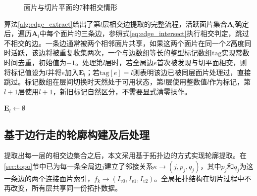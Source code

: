 \begin{figure}[htbp]
\centering
\caption{面片与切片平面的7种相交情形}
\label{fig:intersect_cases}
\end{figure}

算法\ref{alg:edge_extract}给出了第$l$层相交边提取的完整流程，活跃面片集合$\bm{A}_{l}$确定后，遍历$\bm{A}_{l}$中每个面片的三条边，参照式\eqref{eq:edge_intersect}执行相交判定，跳过不相交的边。一条边通常被两个相邻面片共享，如果这两个面片在同一个$Z$高度同时活跃，该边将被重复收集两次，一个与边数组等长的整型标记数组$\bm{\mathrm{tag}}$实现常数时间去重，初始值为$-1$。处理第$l$层时，若全局边$e$首次被发现与切平面相交，则将标记值设为$l$并将$e$加入$\bm{E}_{l}$；若$\bm{\mathrm{tag}}[e]=l$则表明该边已被同层面片处理过，直接跳过。标记数组在层间切换时天然处于可用状态，第$l$层使用整数值$l$作为标记，第$l+1$层使用$l+1$，新旧标记自然区分，不需要显式清零操作。

\begin{algorithm}[htbp]
\caption{相交边提取以及层内去重}
\label{alg:edge_extract}

$\bm{E}_{l}\leftarrow\emptyset$\;
\;
\end{algorithm}

\subsection{基于边行走的轮廓构建及后处理}

提取出每一层的相交边集合之后，本文采用基于拓扑边的方式实现轮廓提取。在\ref{sec:topo}节中已为每一条全局边$j$建立了邻接关系$\kappa\to(j,p_{j},q_{j})$，其中$p_{j}$和$q_{j}$为这一条边的两个连接面片索引，$f_{k}\to(I_{v0},I_{v1},I_{v2})$。全局拓扑结构在切片过程中不再改变，所有层共享同一份拓扑数据。

